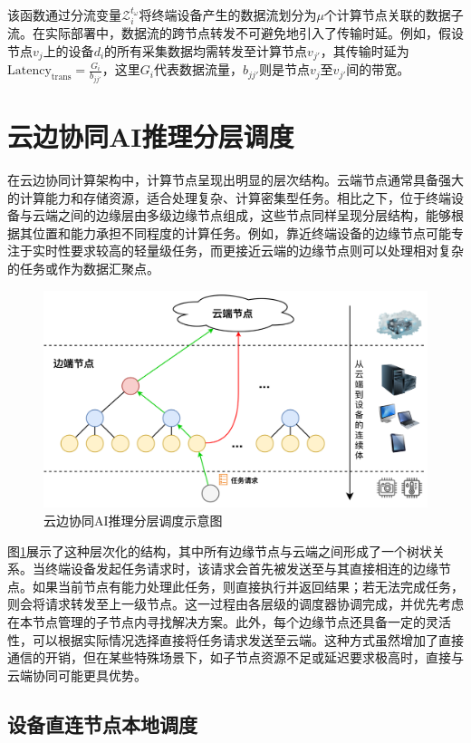 该函数通过分流变量$\mathcal{Z}_i^{t_\omega}$将终端设备产生的数据流划分为$\mu$个计算节点关联的数据子流。在实际部署中，数据流的跨节点转发不可避免地引入了传输时延。例如，假设节点$v_j$上的设备$d_i$的所有采集数据均需转发至计算节点$v_{j'}$，其传输时延为\(\text{Latency}_\text{trans}=\frac{G_i}{b_{jj'}}\)，这里\(G_i\)代表数据流量，$b_{jj'}$则是节点$v_j$至$v_{j'}$间的带宽。

\section{云边协同AI推理分层调度}

在云边协同计算架构中，计算节点呈现出明显的层次结构。云端节点通常具备强大的计算能力和存储资源，适合处理复杂、计算密集型任务。相比之下，位于终端设备与云端之间的边缘层由多级边缘节点组成，这些节点同样呈现分层结构，能够根据其位置和能力承担不同程度的计算任务。例如，靠近终端设备的边缘节点可能专注于实时性要求较高的轻量级任务，而更接近云端的边缘节点则可以处理相对复杂的任务或作为数据汇聚点。

\begin{figure}[h]
  \centering
  \includegraphics[width=0.8\linewidth]{pics/3-5schedule.png}
  \caption{云边协同AI推理分层调度示意图}
  \label{fig:3-5schedule}
\end{figure}

图\ref{fig:3-5schedule}展示了这种层次化的结构，其中所有边缘节点与云端之间形成了一个树状关系。当终端设备发起任务请求时，该请求会首先被发送至与其直接相连的边缘节点。如果当前节点有能力处理此任务，则直接执行并返回结果；若无法完成任务，则会将请求转发至上一级节点。这一过程由各层级的调度器协调完成，并优先考虑在本节点管理的子节点内寻找解决方案。此外，每个边缘节点还具备一定的灵活性，可以根据实际情况选择直接将任务请求发送至云端。这种方式虽然增加了直接通信的开销，但在某些特殊场景下，如子节点资源不足或延迟要求极高时，直接与云端协同可能更具优势。

\subsection{设备直连节点本地调度}

